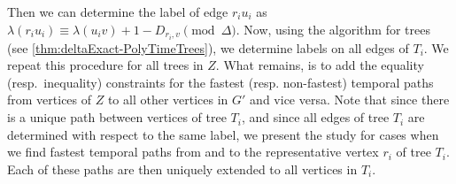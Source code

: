 \documentclass[a4paper,UKenglish,cleveref, autoref, thm-restate, anonymous]{lipics-v2021}
\begin{document}
Then
we can determine the label of edge $r_i u_i$ as 
$\lambda (r_i u_i) \equiv \lambda(u_i v) + 1 - D_{r_i,v} \pmod \Delta$.
Now, using the algorithm for trees (see \cref{thm:deltaExact-PolyTimeTrees}), we determine labels on all edges of $T_i$.
We repeat this procedure for all trees in $Z$.
What remains, is to add the equality (resp.~inequality) constraints for the fastest (resp. non-fastest) temporal paths from vertices of $Z$ to all other vertices in $G'$ and vice versa.
Note that since 
there is a unique path between vertices of tree $T_i$, and since all edges of tree $T_i$ are determined with respect to the same label,
we present the study for cases when we find fastest temporal paths from and to the 
representative vertex $r_i$ of tree $T_i$.
Each of these paths are then uniquely extended to all vertices in $T_i$.
\end{document}
